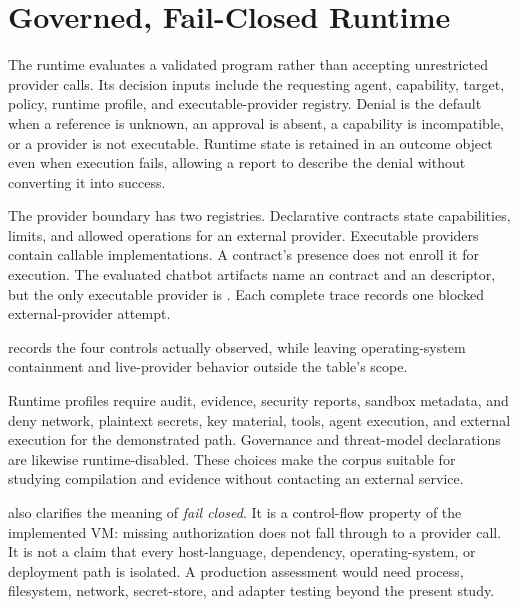 \section{Governed, Fail-Closed Runtime}\label{sec:runtime}

The runtime evaluates a validated program rather than accepting unrestricted
provider calls.  Its decision inputs include the requesting agent, capability,
target, policy, runtime profile, and executable-provider registry.  Denial is
the default when a reference is unknown, an approval is absent, a capability
is incompatible, or a provider is not executable.  Runtime state is retained
in an outcome object even when execution fails, allowing a report to describe
the denial without converting it into success.

The provider boundary has two registries.  Declarative contracts state
capabilities, limits, and allowed operations for an external provider.
Executable providers contain callable implementations.  A contract's presence
does not enroll it for execution.  The evaluated chatbot artifacts name an
 contract and an  descriptor, but the
only executable provider is .  Each complete trace records one
blocked external-provider attempt.

\begin{table}[t]
\centering
\caption{Runtime controls observed in the evaluated profile. These controls
describe application-level behavior, not operating-system sandbox proof.}
\label{tab:runtime-controls}

\end{table}

 records the four controls actually observed, while
leaving operating-system containment and live-provider behavior outside the
table's scope.

Runtime profiles require audit, evidence, security reports, sandbox metadata,
and deny network, plaintext secrets, key material, tools, agent execution, and
external execution for the demonstrated path.  Governance and threat-model
declarations are likewise runtime-disabled.  These choices make the corpus
suitable for studying compilation and evidence without contacting an external
service.

 also clarifies the meaning of \emph{fail closed}.
It is a control-flow property of the implemented VM: missing authorization
does not fall through to a provider call.  It is not a claim that every
host-language, dependency, operating-system, or deployment path is isolated.
A production assessment would need process, filesystem, network, secret-store,
and adapter testing beyond the present study.

